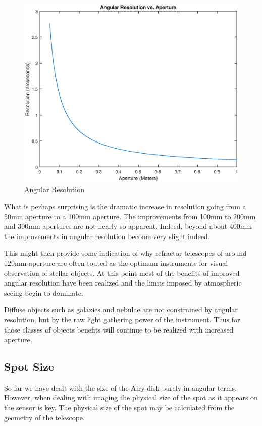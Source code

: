 \documentclass[11pt]{article}
\begin{document}
\bigskip
\begin{figure}[htb]
	\begin{center}
		\includegraphics[scale=0.7]{./images/resolution.eps}
		\caption{Angular Resolution}
		\label{fig:resolution}
	\end{center}
\end{figure}

What is perhaps surprising is the dramatic increase in resolution going from a 50mm aperture to a 100mm aperture. The improvements from 100mm to 200mm and 300mm apertures are not nearly so apparent.  Indeed, beyond about 400mm the improvements in angular resolution become very slight indeed.

This might then provide some indication of why refractor telescopes of around 120mm aperture are often touted as the optimum instruments for visual observation of stellar objects.  At this point most of the benefits of improved angular resolution have been realized and the  limits imposed by atmospheric seeing begin to dominate.

Diffuse objects such as galaxies and nebulae are not constrained by angular resolution, but by the raw light gathering power of the instrument.  Thus for those classes of objects benefits will continue to be realized with increased aperture.   


\subsection{Spot Size}
So far we have dealt with the size of the Airy disk purely in angular terms.  However, when dealing with imaging the physical size of the spot as it appears on the sensor is key.  The physical size of the spot may be calculated from the geometry of the telescope.  
\end{document}
